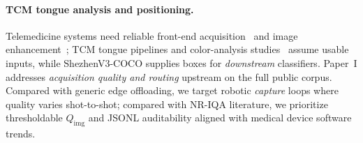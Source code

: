 \paragraph{TCM tongue analysis and positioning.}
Telemedicine systems need reliable front-end acquisition~\cite{chen2021telemed} and image enhancement~\cite{deng2026op4ksr}; TCM tongue pipelines and color-analysis studies~\cite{zhang2020tongue,qi2016tongue,huang2015tcn} assume usable inputs, while ShezhenV3-COCO supplies boxes for \emph{downstream} classifiers.
Paper~I addresses \emph{acquisition quality and routing} upstream on the full public corpus.
Compared with generic edge offloading, we target robotic \emph{capture} loops where quality varies shot-to-shot; compared with NR-IQA literature, we prioritize thresholdable $Q_{\mathrm{img}}$ and JSONL auditability aligned with medical device software trends.
